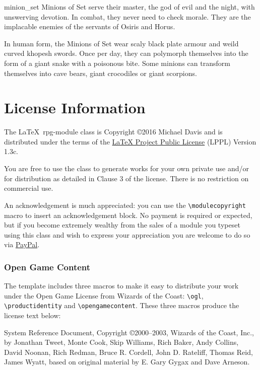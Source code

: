 \documentclass[letterpaper,serif]{rpg-module}
\begin{document}

\begin{newmonster}{minion_set}\label{minion_set}%
Minions of Set serve their master, the god of evil and the night, with unswerving devotion. In combat, they
never need to check morale. They are the implacable enemies of the servants of Osiris and Horus.

In human form, the Minions of Set wear scaly black plate armour and weild curved khopesh swords. Once per
day, they can polymorph themselves into the form of a giant snake with a poisonous bite. Some minions can
transform themselves into cave bears, giant crocodiles or giant scorpions.
\end{newmonster}

\part{License Information}

The \LaTeX~rpg-module class is Copyright \copyright 2016 Michael Davis and is distributed under the terms of the
\href{http://www.latex-project.org/lppl.txt}{LaTeX Project Public License} (LPPL) Version 1.3c.

You are free to use the class to generate works for your own private use and/or for distribution as detailed in
Clause 3 of the license. There is no restriction on commercial use.

An acknowledgement is much appreciated: you can use the \verb|\modulecopyright| macro to insert an acknowledgement
block. No payment is required or expected, but if you become extremely wealthy from the sales of a module
you typeset using this class and wish to express your appreciation you are welcome to do so via
\href{https://paypal.me/slithy}{PayPal}.

%
%

\section{Open Game Content}
\label{ogl}

The template includes three macros to make it easy to distribute your work under the Open Game License
from Wizards of the Coast: \verb|\ogl|, \verb|\productidentity| and \verb|\opengamecontent|. These three
macros produce the license text below:

\begin{ogl}
\item System Reference Document, Copyright \copyright 2000--2003, Wizards of the Coast, Inc., by Jonathan Tweet, Monte Cook,
Skip Williams, Rich Baker, Andy Collins, David Noonan, Rich Redman, Bruce R. Cordell, John D. Rateliff, Thomas Reid, James
Wyatt, based on original material by E. Gary Gygax and Dave Arneson.
\end{ogl}
\end{document}
